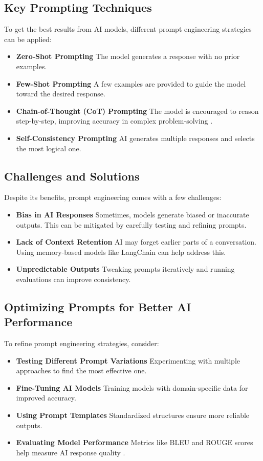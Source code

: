 \subsection{Key Prompting Techniques}
To get the best results from AI models, different prompt engineering strategies can be applied:

\begin{itemize}
    \item \textbf{Zero-Shot Prompting}  The model generates a response with no prior examples.
    \item \textbf{Few-Shot Prompting}  A few examples are provided to guide the model toward the desired response.
    \item \textbf{Chain-of-Thought (CoT) Prompting}  The model is encouraged to reason step-by-step, improving accuracy in complex problem-solving \cite{wei2022chain}.
    \item \textbf{Self-Consistency Prompting}  AI generates multiple responses and selects the most logical one.
\end{itemize}

\subsection{Challenges and Solutions}
Despite its benefits, prompt engineering comes with a few challenges:

\begin{itemize}
    \item \textbf{Bias in AI Responses} Sometimes, models generate biased or inaccurate outputs. This can be mitigated by carefully testing and refining prompts.
    \item \textbf{Lack of Context Retention}  AI may forget earlier parts of a conversation. Using memory-based models like LangChain can help address this.
    \item \textbf{Unpredictable Outputs} Tweaking prompts iteratively and running evaluations can improve consistency.
\end{itemize}

\subsection{Optimizing Prompts for Better AI Performance}
To refine prompt engineering strategies, consider:

\begin{itemize}
    \item \textbf{Testing Different Prompt Variations}  Experimenting with multiple approaches to find the most effective one.
    \item \textbf{Fine-Tuning AI Models}  Training models with domain-specific data for improved accuracy.
    \item \textbf{Using Prompt Templates} Standardized structures ensure more reliable outputs.
    \item \textbf{Evaluating Model Performance}  Metrics like BLEU and ROUGE scores help measure AI response quality \cite{papineni2002bleu}.
\end{itemize}

